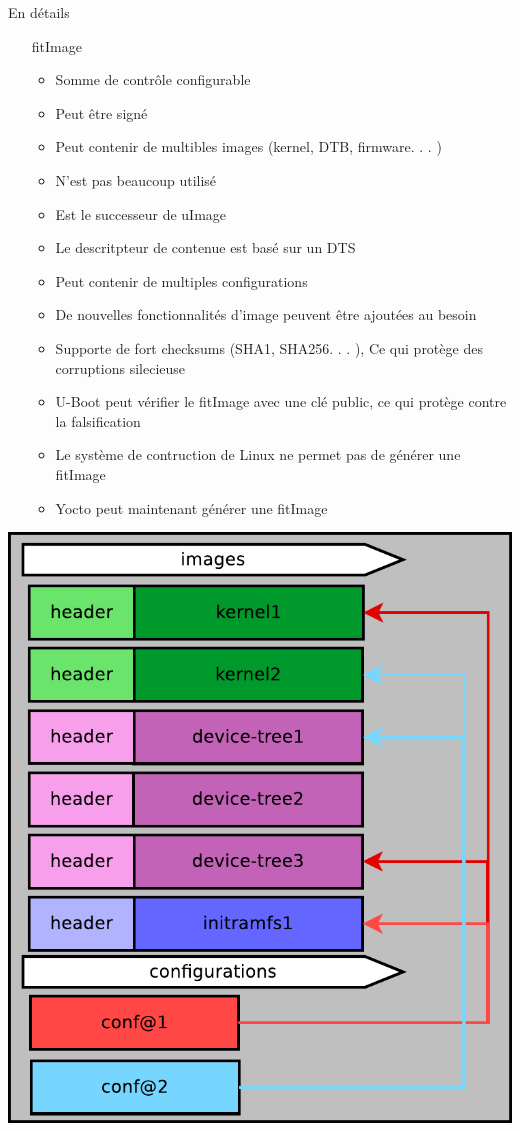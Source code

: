 \documentclass[aspectratio=169]{beamer}
\begin{document}
\begin{frame}{En détails}
\begin{itemize}
	\item[fitImage]
	\begin{itemize}
	 	\item Somme de contrôle configurable
	 	\item Peut être signé
	 	\item Peut contenir de multibles images (kernel, DTB, firmware. . . )
	 	\item N'est pas beaucoup utilisé
 		\item Est le successeur de uImage
	 	\item Le descritpteur de contenue est basé sur un DTS
	 	\item Peut contenir de multiples configurations
	 	\item De nouvelles fonctionnalités d'image peuvent être ajoutées au besoin
	 	\item Supporte de fort checksums (SHA1, SHA256. . . ), Ce qui protège des corruptions silecieuse
	 	\item U-Boot peut vérifier le fitImage avec une clé public, ce qui protège contre la falsification
	 	\item Le système de contruction de Linux ne permet pas de générer une fitImage
	 	\item Yocto peut maintenant générer une fitImage
	\end{itemize}
\end{itemize}
\end{frame}

\begin{frame}
\begin{center}
\includegraphics[height=0.9\textheight]{images/fitImage.png}
\end{center}
\end{frame}
\end{document}
